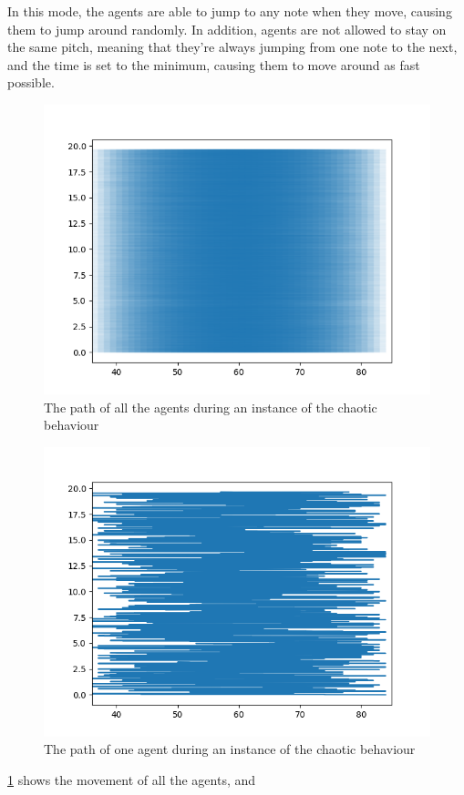 \documentclass[a4paper,english]{report}
\begin{document}
	In this mode, the agents are able to jump to any note when they move, causing them to jump around randomly. In addition, agents are not allowed to stay on the same pitch, meaning that they're always jumping from one note to the next, and the time is set to the minimum, causing them to move around as fast possible.
	\begin{figure}
		\centering
		\includegraphics[width=1\linewidth]{chaos}
		\caption{The path of all the agents during an instance of the chaotic behaviour}
		\label{fig:chaos}
	\end{figure}
	\begin{figure}
		\centering
		\includegraphics[width=1\linewidth]{chaosOneAgent}
		\caption{The path of one agent during an instance of the chaotic behaviour}
		\label{fig:chaosOne}
	\end{figure}
	\ref{fig:chaos} shows the movement of all the agents, and 
	
\end{document}
